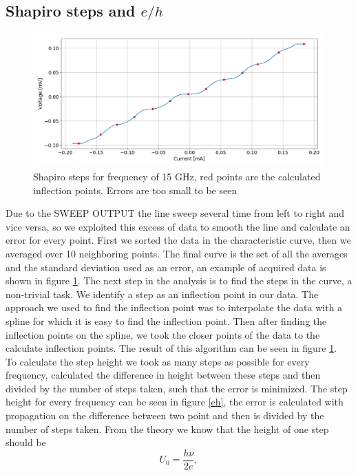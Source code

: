 \documentclass[a4paper,10pt]{article}
\begin{document}
\subsection{Shapiro steps and $e/h$}
\begin{figure}[H]
\centering
\includegraphics[width = \textwidth]{shapirosteps}
\caption{Shapiro steps for frequency of 15 GHz, red points are the calculated inflection points. Errors are too small to be seen}\label{shapiro}
\end{figure}
Due to the SWEEP OUTPUT the line sweep several time from left to right and vice versa, so we exploited this excess of data to smooth the line and calculate an error for every point. First we sorted the data in the characteristic curve, then we averaged over 10 neighboring points. The final curve is the set of all the averages and the standard deviation used as an error, an example of acquired data is shown in figure \ref{shapiro}. The next step in the analysis is to find the steps in the curve, a non-trivial task. We identify a step as an inflection point in our data. The approach we used to find the inflection point was to interpolate the data with a spline for which it is easy to find the inflection point. Then after finding the inflection points on the spline, we took the closer points of the data to the calculate inflection points. The result of this algorithm can be seen in figure \ref{shapiro}.\\
To calculate the step height we took as many steps as possible for every frequency, calculated the difference in height between these steps and then divided by the number of steps taken, such that the error is minimized. The step height for every frequency can be seen in figure \ref{eh}, the error is calculated with propagation on the difference between two point and then is divided by the number of steps taken. From the theory we know that the height of one step should be
\begin{equation}U_0 = \frac{h\nu}{2e},\end{equation}
\end{document}
